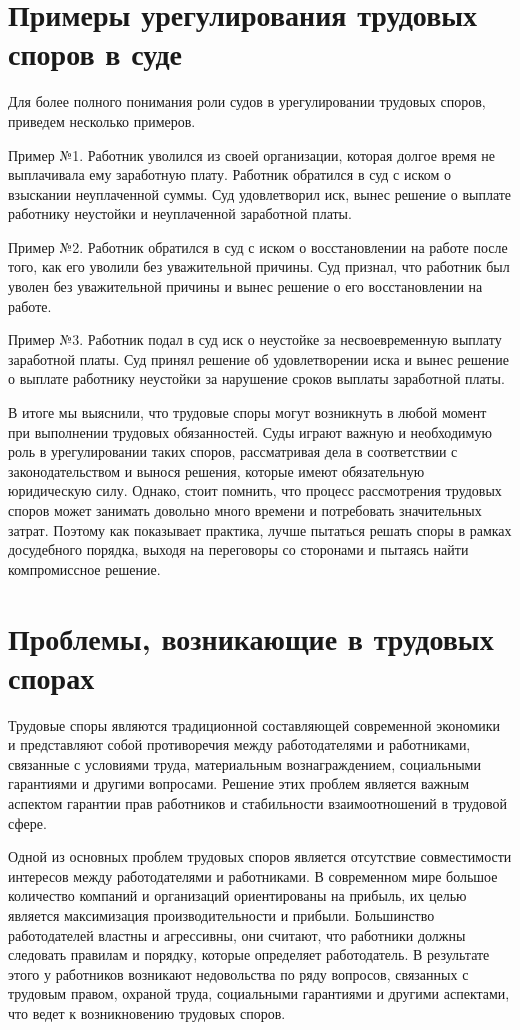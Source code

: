 \section{Примеры урегулирования трудовых споров в суде}

Для более полного понимания роли судов в урегулировании трудовых споров, приведем несколько примеров.

Пример №1. Работник уволился из своей организации, которая долгое время не выплачивала ему заработную плату. Работник обратился в суд с иском о взыскании неуплаченной суммы. Суд удовлетворил иск, вынес решение о выплате работнику неустойки и неуплаченной заработной платы.

Пример №2. Работник обратился в суд с иском о восстановлении на работе после того, как его уволили без уважительной причины. Суд признал, что работник был уволен без уважительной причины и вынес решение о его восстановлении на работе.

Пример №3. Работник подал в суд иск о неустойке за несвоевременную выплату заработной платы. Суд принял решение об удовлетворении иска и вынес решение о выплате работнику неустойки за нарушение сроков выплаты заработной платы.

В итоге мы выяснили, что трудовые споры могут возникнуть в любой момент при выполнении трудовых обязанностей. Суды играют важную и необходимую роль в урегулировании таких споров, рассматривая дела в соответствии с законодательством и вынося решения, которые имеют обязательную юридическую силу. Однако, стоит помнить, что процесс рассмотрения трудовых споров может занимать довольно много времени и потребовать значительных затрат. Поэтому как показывает практика, лучше пытаться решать споры в рамках досудебного порядка, выходя на переговоры со сторонами и пытаясь найти компромиссное решение.

\section{Проблемы, возникающие в трудовых спорах}

Трудовые споры являются традиционной составляющей современной экономики и представляют собой противоречия между работодателями и работниками, связанные с условиями труда, материальным вознаграждением, социальными гарантиями и другими вопросами. Решение этих проблем является важным аспектом гарантии прав работников и стабильности взаимоотношений в трудовой сфере.

Одной из основных проблем трудовых споров является отсутствие совместимости интересов между работодателями и работниками. В современном мире большое количество компаний и организаций ориентированы на прибыль, их целью является максимизация производительности и прибыли. Большинство работодателей властны и агрессивны, они считают, что работники должны следовать правилам и порядку, которые определяет работодатель. В результате этого у работников возникают недовольства по ряду вопросов, связанных с трудовым правом, охраной труда, социальными гарантиями и другими аспектами, что ведет к возникновению трудовых споров.

